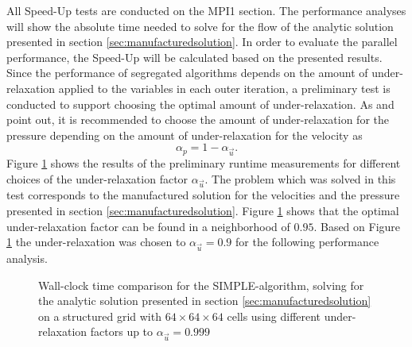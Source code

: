 All Speed-Up tests are conducted on the MPI1 section. The performance analyses will show the absolute time needed to solve for the flow of the analytic solution presented in section \ref{sec:manufacturedsolution}. In order to evaluate the parallel performance, the Speed-Up will be calculated based on the presented results. Since the performance of segregated algorithms depends on the amount of under-relaxation applied to the variables in each outer iteration, a preliminary test is conducted to support choosing the optimal amount of under-relaxation. As \cite{ferziger02} and \cite{schaefer99} point out, it is recommended to choose the amount of under-relaxation for the pressure depending on the amount of under-relaxation for the velocity as
\begin{displaymath}
  \alpha_p = 1 - \alpha_{\vec{u}}.
\end{displaymath}
Figure \ref{fig:underrelax} shows the results of the preliminary runtime measurements for different choices of the under-relaxation factor \( \alpha_{\vec{u}} \). The problem which was solved in this test corresponds to the manufactured solution for the velocities and the pressure presented in section \ref{sec:manufacturedsolution}. Figure \ref{fig:underrelax} shows that the optimal under-relaxation factor can be found in a neighborhood of \(0.95\). Based on Figure \ref{fig:underrelax} the under-relaxation was chosen to \( \alpha_{\vec{u}} =0.9 \) for the following performance analysis. 

\begin{figure}[h!]
  \centering
  \caption{Wall-clock time comparison for the SIMPLE-algorithm, solving for the analytic solution presented in section \ref{sec:manufacturedsolution} on a structured grid with $64\times64\times64$ cells using different under-relaxation factors up to $\alpha_\vec{u}=0.999$}
  \label{fig:underrelax}
\end{figure}

